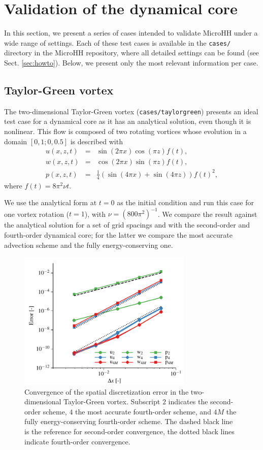 \documentclass[gmd,manuscript]{copernicus}
\begin{document}
 \section{Validation of the dynamical core} \label{sec:tests}
In this section, we present a series of cases intended to validate MicroHH under a wide range of settings. Each of these test cases is available in the \texttt{cases/} directory in the MicroHH repository, where all detailed settings can be found (see Sect. \ref{sec:howto}). Below, we present only the most relevant information per case.

\subsection{Taylor-Green vortex}
The two-dimensional Taylor-Green vortex (\texttt{cases/taylorgreen}) presents an ideal test case for a dynamical core as it has an analytical solution, even though it is nonlinear. This flow is composed of two rotating vortices whose evolution in a domain $\left[0,1; 0,0.5 \right]$ is described with
\begin{eqnarray}
u(x,z,t) & = & \sin(2\pi x) \cos(\pi z) f(t),\\
w(x,z,t) & = & \cos(2\pi x) \sin(\pi z) f(t),\\
p(x,z,t) & = & \tfrac{1}{4} \left(\sin(4 \pi x) + \sin(4 \pi z) \right) f(t)^2,
\end{eqnarray}
where $f(t) = 8 \pi^2 \nu t$.

We use the analytical form at $t=0$ as the initial condition and run this case for one vortex rotation ($t = 1$), with $\nu = (800 \pi^2)^{-1}$. We compare the result against the analytical solution for a set of grid spacings and with the second-order and fourth-order dynamical core; for the latter we compare the most accurate advection scheme and the fully energy-conserving one.
\begin{figure}[t]
	\vspace*{2mm}
	\begin{center}
		\includegraphics[width=8.3cm]{figs/taylorgreen.pdf}
	\end{center}
	\caption{Convergence of the spatial discretization error in the two-dimensional Taylor-Green vortex. Subscript $2$ indicates the second-order scheme, $4$ the most accurate fourth-order scheme, and $4M$ the fully energy-conserving fourth-order scheme. The dashed black line is the reference for second-order convergence, the dotted black lines indicate fourth-order convergence.}\label{fig:taylorgreen}
\end{figure}
\end{document}
